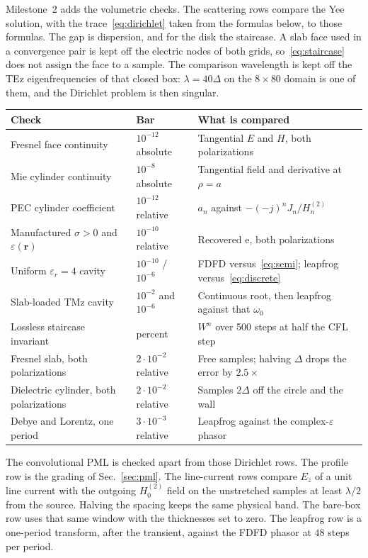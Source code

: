 \documentclass[11pt,a4paper]{article}
\numberwithin{equation}{section}
\begin{document}
Milestone~2 adds the volumetric checks. The scattering rows compare the Yee
solution, with the trace~\eqref{eq:dirichlet} taken from the formulas below,
to those formulas. The gap is dispersion, and for the disk the staircase.
A slab face used in a convergence pair is kept off the electric nodes of
both grids, so~\eqref{eq:staircase} does not assign the face to a sample.
The comparison wavelength is kept off the TEz eigenfrequencies of that
closed box: $\lambda=40\Delta$ on the $8\times 80$ domain is one of them,
and the Dirichlet problem is then singular.

\begin{center}
\small
\begin{tabular}{@{}>{\raggedright\arraybackslash}p{5.0cm}>{\raggedright\arraybackslash}p{3.5cm}>{\raggedright\arraybackslash}p{6.2cm}@{}}
\toprule
Check & Bar & What is compared\\
\midrule
Fresnel face continuity & $10^{-12}$ absolute & Tangential $E$ and $H$, both polarizations\\
Mie cylinder continuity & $10^{-8}$ absolute & Tangential field and derivative at $\rho=a$\\
PEC cylinder coefficient & $10^{-12}$ relative & $a_n$ against $-(-j)^n J_n/H_n^{(2)}$\\
Manufactured $\sigma>0$ and $\varepsilon(\mathbf{r})$ & $10^{-10}$ relative & Recovered $\mathrm{e}$, both polarizations\\
Uniform $\varepsilon_r=4$ cavity & $10^{-10}$ / $10^{-6}$ & FDFD versus~\eqref{eq:semi}; leapfrog versus~\eqref{eq:discrete}\\
Slab-loaded TMz cavity & $10^{-2}$ and $10^{-6}$ & Continuous root, then leapfrog against that $\omega_0$\\
Lossless staircase invariant & 1 percent & $W^n$ over 500 steps at half the CFL step\\
Fresnel slab, both polarizations & $2\cdot 10^{-2}$ relative & Free samples; halving $\Delta$ drops the error by $2.5\times$\\
Dielectric cylinder, both polarizations & $2\cdot 10^{-2}$ relative & Samples $2\Delta$ off the circle and the wall\\
Debye and Lorentz, one period & $3\cdot 10^{-3}$ relative & Leapfrog against the complex-$\varepsilon$ phasor\\
\bottomrule
\end{tabular}
\end{center}

The convolutional PML is checked apart from those Dirichlet rows. The
profile row is the grading of Sec.~\ref{sec:pml}. The line-current rows
compare $E_z$ of a unit line current with the outgoing $H_0^{(2)}$ field
on the unstretched samples at least $\lambda/2$ from the source. Halving
the spacing keeps the same physical band. The bare-box row uses that same
window with the thicknesses set to zero. The leapfrog row is a one-period
transform, after the transient, against the FDFD phasor at $48$ steps per
period.
\end{document}
